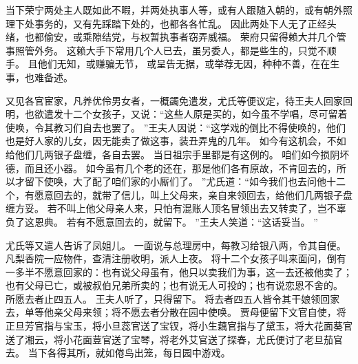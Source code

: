 \par
当下荣宁两处主人既如此不暇，并两处执事人等，或有人跟随入朝的，或有朝外照理下处事务的，又有先踩踏下处的，也都各各忙乱。
因此两处下人无了正经头绪，也都偷安，或乘隙结党，与权暂执事者窃弄威福。
荣府只留得赖大并几个管事照管外务。
这赖大手下常用几个人已去，虽另委人，都是些生的，只觉不顺手。
且他们无知，或赚骗无节，
或呈告无据，或举荐无因，种种不善，在在生事，也难备述。
\par
又见各官宦家，凡养优伶男女者，一概蠲免遣发，尤氏等便议定，待王夫人回家回明，也欲遣发十二个女孩子，又说：“这些人原是买的，如今虽不学唱，尽可留着使唤，令其教习们自去也罢了。
”王夫人因说：“这学戏的倒比不得使唤的，他们也是好人家的儿女，因无能卖了做这事，装丑弄鬼的几年。
如今有这机会，不如给他们几两银子盘缠，各自去罢。
当日祖宗手里都是有这例的。
咱们如今损阴坏德，而且还小器。
如今虽有几个老的还在，那是他们各有原故，不肯回去的，所以才留下使唤，大了配了咱们家的小厮们了。
”尤氏道：“如今我们也去问他十二个，有愿意回去的，就带了信儿，叫上父母来，亲自来领回去，给他们几两银子盘缠方妥。
若不叫上他父母亲人来，只怕有混账人顶名冒领出去又转卖了，岂不辜负了这恩典。
若有不愿意回去的，就留下。
”王夫人笑道：“这话妥当。
”\par
尤氏等又遣人告诉了凤姐儿。
一面说与总理房中，每教习给银八两，令其自便。
凡梨香院一应物件，查清注册收明，派人上夜。
将十二个女孩子叫来面问，倒有一多半不愿意回家的：也有说父母虽有，他只以卖我们为事，这一去还被他卖了；也有父母已亡，或被叔伯兄弟所卖的；也有说无人可投的；也有说恋恩不舍的。
所愿去者止四五人。
王夫人听了，只得留下。
将去者四五人皆令其干娘领回家去，单等他亲父母来领；将不愿去者分散在园中使唤。
贾母便留下文官自使，将正旦芳官指与宝玉，将小旦蕊官送了宝钗，将小生藕官指与了黛玉，将大花面葵官送了湘云，将小花面荳官送了宝琴，将老外艾官送了探春，尤氏便讨了老旦茄官去。
当下各得其所，就如倦鸟出笼，每日园中游戏。
